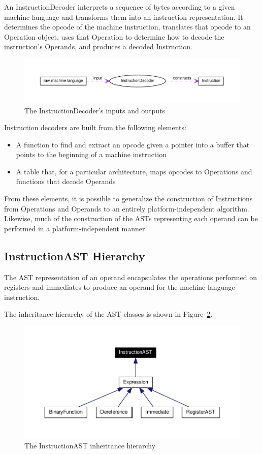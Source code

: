 An InstructionDecoder interprets a sequence of bytes according to a given
machine language and transforms them into an instruction representation. It
determines the opcode of the machine instruction, translates that opcode to an
Operation object, uses that Operation to determine how to decode the
instruction's Operands, and produces a decoded Instruction.

\begin{figure}
\includegraphics{fig/decoder_use}
\caption{The InstructionDecoder's inputs and outputs}
\label{fig:decoder-use}
\end{figure}
 
Instruction decoders are built from the following elements:

\begin{itemize}
\item A function to find and extract an opcode given a pointer into a buffer that points to the beginning of a machine instruction
\item A table that, for a particular architecture, maps opcodes to Operations and functions that decode Operands
\end{itemize}

From these elements, it is possible to generalize the construction of
Instructions from Operations and Operands to an entirely platform-\/independent
algorithm. Likewise, much of the construction of the ASTs representing each
operand can be performed in a platform-\/independent manner. 

\subsection{InstructionAST Hierarchy}
\label{subsec:hierarchy}

The AST representation of an operand encapsulates the operations performed on
registers and immediates to produce an operand for the machine language
instruction.

The inheritance hierarchy of the AST classes is shown in
Figure~\ref{fig:inheritance}. 
\begin{figure}
\includegraphics{fig/full_inheritance_graph}
\caption{The InstructionAST inheritance hierarchy}
\label{fig:inheritance}
\end{figure}

